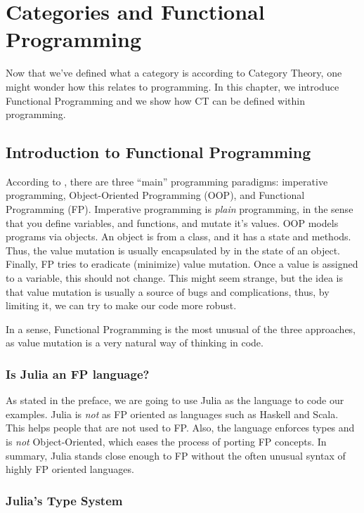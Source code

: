 \chapter{Categories and Functional Programming}

Now that we've defined what a category is according to Category Theory,
one might wonder how this relates to programming. In this chapter,
we introduce Functional Programming and we show how CT can be defined
within programming.

\section{Introduction to Functional Programming}

According to \citet{widman2022learning},
there are three ``main'' programming paradigms: imperative programming, Object-Oriented Programming (OOP), and Functional Programming (FP).
Imperative programming is \textit{plain} programming, in the sense that you define variables, and functions, and mutate it's values.
OOP models programs via objects. An object is from a class, and it has a state and methods. Thus, the value mutation is usually
encapsulated by in the state of an object.
Finally, FP tries to eradicate (minimize) value mutation. Once a value is assigned to a variable, this should not change.
This might seem strange, but the idea is that value mutation is usually a source of bugs and complications, thus,
by limiting it, we can try to make our code more robust.

In a sense, Functional Programming is the most unusual of the three approaches, as value mutation
is a very natural way of thinking in code.

\subsection{Is Julia an FP language?}

As stated in the preface, we are going to use
Julia as the language to code our examples.
Julia is \textit{not} as FP oriented as languages such as Haskell and Scala.
This helps people that are not used to FP. Also,
the language enforces types and is \textit{not} Object-Oriented, which eases
the process of porting FP concepts. In summary, Julia stands close enough to FP
without the often unusual syntax of highly FP oriented languages.

\subsection{Julia's Type System}

